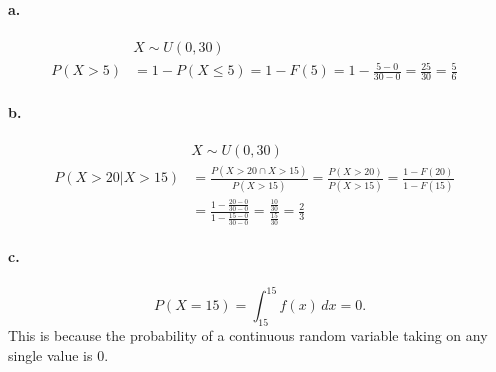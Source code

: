 \paragraph*{a.}
\begin{align*}
    &X \sim U(0,30)& \\
    P(X>5) &= 1 - P(X \leq 5) = 1 - F(5) = 1 - \frac{5-0}{30-0} = \frac{25}{30} = \frac{5}{6}
\end{align*}

\paragraph*{b.}
\begin{align*}
    &X \sim U(0,30)& \\
    P(X>20 | X>15) &= \frac{P(X>20 \cap X>15)}{P(X>15)} = \frac{P(X>20)}{P(X>15)} = \frac{1 - F(20)}{1 - F(15)} \\
    &= \frac{1 - \frac{20-0}{30-0}}{1 - \frac{15-0}{30-0}} = \frac{\frac{10}{30}}{\frac{15}{30}} = \frac{2}{3}
\end{align*}

\paragraph*{c.}
\[P(X=15) = \int_{15}^{15} f(x) \,dx = 0.\]
This is because the probability of a continuous random variable taking on any single value is 0.

